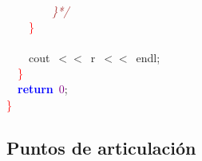 \documentclass[10pt,a4paper,twoside]{article}
\begin{document}
{{{{{{{\mbox{}\textit{\textcolor{Brown}{\ \ \ \ \ \ \ \ \}*/}} \\
\mbox{}\ \ \ \ \textcolor{Red}{\}} \\
\mbox{} \\
\mbox{}\ \ \ \ cout\ \textcolor{BrickRed}{$<<$}\ r\ \textcolor{BrickRed}{$<<$}\ endl\textcolor{BrickRed}{;} \\
\mbox{}\ \ \textcolor{Red}{\}} \\
\mbox{}\ \ \textbf{\textcolor{Blue}{return}}\ \textcolor{Purple}{0}\textcolor{BrickRed}{;} \\
\mbox{}\textcolor{Red}{\}} \\

} \normalfont\normalsize

\subsection{Puntos de articulación}
{\ttfamily \raggedright {

}}}}}}}}
\end{document}
